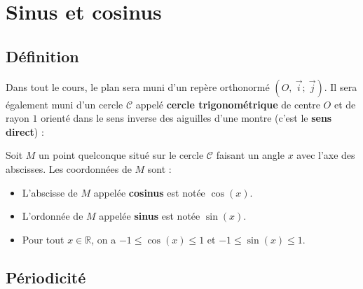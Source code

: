 


	
	
	

	\section{Sinus et cosinus}

	\subsection{Définition}

	Dans tout le cours, le plan sera muni d'un repère orthonormé $(O,\ \overrightarrow{i} ;\ \overrightarrow{j})$. Il sera également muni d'un cercle $\mathcal{C}$ appelé \textbf{cercle trigonométrique} de centre $O$ et de rayon $1$ orienté dans le sens inverse des aiguilles d'une montre (c'est le \textbf{sens direct}) :


	\begin{formula}
		Soit $M$ un point quelconque situé sur le cercle $\mathcal{C}$ faisant un angle $x$ avec l'axe des abscisses. Les coordonnées de $M$ sont :
		\begin{itemize}
			\item L'abscisse de $M$ appelée \textbf{cosinus} est notée $\cos(x)$.
			\item L'ordonnée de $M$ appelée \textbf{sinus} est notée $\sin(x)$.
			\item Pour tout $x \in \mathbb{R}$, on a $-1 \leq \cos(x) \leq 1$ et $-1 \leq \sin(x) \leq 1$.
		\end{itemize}
	\end{formula}

	\subsection{Périodicité}

